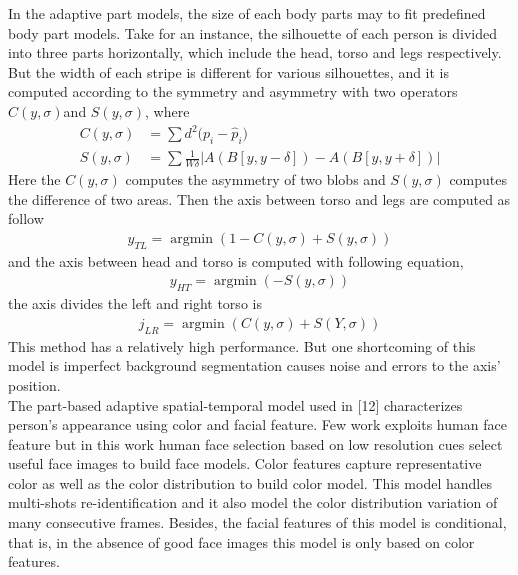 In the adaptive part models, the size of each body parts may to fit predefined body part models. Take \cite{SDALF} for an instance, the silhouette of each person is divided into three parts horizontally, which include the head, torso and legs respectively. But the width of each stripe is different for various silhouettes, and it is computed according to the symmetry and asymmetry with two operators $C(y, \sigma) $and $S(y,\sigma)$, where 
\begin{equation}
\begin{aligned}
C(y,\sigma) & = \sum{d^2(p_i-{\hat{p}_i)}} \\
S(y,\sigma) &= \sum{\frac{1}{W\delta}|A(B[y,y-\delta]) - A(B[y,y+\delta])|}
\end{aligned}
\end{equation}
Here the $C(y, \sigma)$ computes the asymmetry of two blobs and $S(y,\sigma)$ computes the difference of two areas. Then the axis between torso and legs are computed as follow
\begin{equation}
\begin{aligned}
y_{TL} = \mathop{\arg\min}(1-C(y,\sigma)+S(y,\sigma))
\end{aligned}
\end{equation}
and the axis  between head and torso is computed with following equation,
\begin{equation}
\begin{aligned}
y_{HT} = \mathop{\arg\min}(-S(y,\sigma))
\end{aligned}
\end{equation}
the axis divides the left and right torso is
\begin{equation}
\begin{aligned}
j_{LR} = \mathop{\arg\min}(C(y,\sigma)+S(Y,\sigma))
\end{aligned}
\end{equation}
This method has a relatively high performance. But one shortcoming of this model is imperfect background segmentation causes noise and errors to the axis' position. \\
\indent The part-based adaptive spatial-temporal model used in [12] characterizes person's appearance using color and facial feature. Few work exploits human face feature but in this work human face selection based on low resolution cues select useful face images to build face models. Color features capture representative color as well as the color distribution to build color model. This model handles multi-shots re-identification and it also model the color distribution variation of many consecutive frames.  Besides, the facial features of this model is conditional, that is, in the absence of good face images this model is only based on color features.

